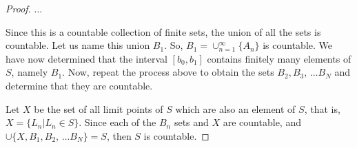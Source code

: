 \documentclass[letterpaper]{article}
\begin{document}
\begin{proof}
$\ldots$

\noindent Since this is a countable collection of finite sets, the union of all the sets is countable. 
%
Let us name this union $B_1$. So, $B_1 = \cup_{n=1}^{\infty} \{A_n\}$ is countable. We have now determined that the interval $[b_0,b_1]$ contains finitely many elements of $S$, namely $B_1$.
%
Now, repeat the process above to obtain the sets $B_2, B_3, \, \ldots B_N$ and determine that they are countable. 

Let $X$ be the set of all limit points of $S$ which are also an element of $S$, that is, $X = \{L_n | L_n \in S\}$.
%
Since each of the $B_n$ sets and $X$ are countable, and $\cup\{X, B_1, B_2, \, \ldots B_N\} = S$, then $S$ is countable. 



\end{proof}
\end{document}
